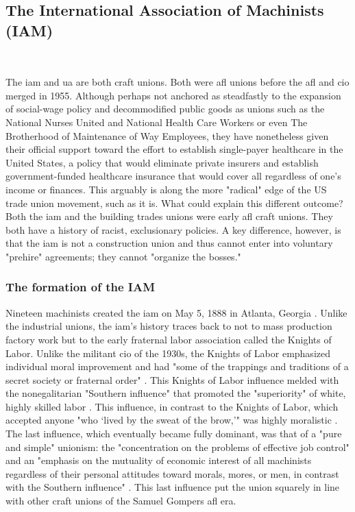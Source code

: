 \documentclass[12pt]{article}
\begin{document}
\subsection{The International Association of Machinists (IAM)}\

The \acrfull{iam} and \acrshort{ua} are both craft unions. Both were \acrfull{afl} unions before the \acrshort{afl} and \acrshort{cio} merged in 1955. Although perhaps not anchored as steadfastly to the expansion of social-wage policy and decommodified public goods as unions such as the National Nurses United and National Health Care Workers or even The Brotherhood of Maintenance of Way Employees, they have nonetheless given their official support toward the effort to establish single-payer healthcare in the United States, a policy that would eliminate private insurers and establish government-funded healthcare insurance that would cover all regardless of one's income or finances. This arguably is along the more "radical" edge of the US trade union movement, such as it is. What could explain this different outcome? Both the \acrshort{iam} and the building trades unions were early \acrshort{afl} craft unions. They both have a history of racist, exclusionary policies. A key difference, however, is that the \acrshort{iam} is not a construction union and thus cannot enter into voluntary "prehire" agreements; they cannot "organize the bosses."

\subsubsection{The formation of the IAM}

Nineteen machinists created the \acrshort{iam} on May 5, 1888 in Atlanta, Georgia \parencite{iamawHistoryIAMTimeline}. Unlike the industrial unions, the \acrshort{iam}'s history traces back to not to mass production factory work but to the early fraternal labor association called the Knights of Labor. Unlike the militant \acrfull{cio} of the 1930s, the Knights of Labor emphasized individual moral improvement and had "some of the trappings and traditions of a secret society or fraternal order" \parencite[3]{perlmanMachinistsNewStudy1961}. This Knights of Labor influence melded with the nonegalitarian "Southern influence" that promoted the "superiority" of white, highly skilled labor \parencite[3]{perlmanMachinistsNewStudy1961}. This influence, in contrast to the Knights of Labor, which accepted anyone "who `lived by the sweat of the brow,'" was highly moralistic \parencite[5]{perlmanMachinistsNewStudy1961}. The last influence, which eventually became fully dominant, was that of a "pure and simple" unionism: the "concentration on the problems of effective job control" and an "emphasis on the mutuality of economic interest of all machinists regardless of their personal attitudes toward morals, mores, or men, in contrast with the Southern influence" \parencite[4]{perlmanMachinistsNewStudy1961}. This last influence put the union squarely in line with other craft unions of the Samuel Gompers \acrshort{afl} era.
\end{document}
